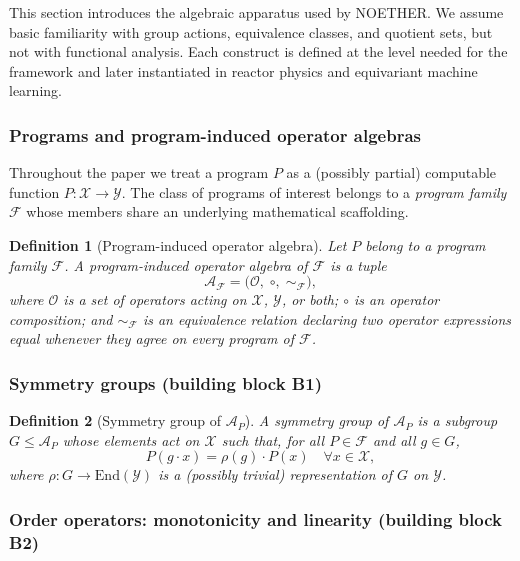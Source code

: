 \documentclass[manuscript]{acmart}
\newtheorem{definition}{Definition}
\begin{document}
This section introduces the algebraic apparatus used by NOETHER. We assume basic familiarity with group actions, equivalence classes, and quotient sets, but not with functional analysis. Each construct is defined at the level needed for the framework and later instantiated in reactor physics and equivariant machine learning.

\subsubsection{Programs and program-induced operator algebras}

Throughout the paper we treat a program $P$ as a (possibly partial) computable function $P: \mathcal{X} \to \mathcal{Y}$. The class of programs of interest belongs to a \emph{program family} $\mathcal{F}$ whose members share an underlying mathematical scaffolding.

\begin{definition}[Program-induced operator algebra]
Let $P$ belong to a program family $\mathcal{F}$. A \emph{program-induced operator algebra} of $\mathcal{F}$ is a tuple
$$\mathcal{A}_{\mathcal{F}} = \bigl(\mathcal{O}, \;\circ, \;\sim_{\mathcal{F}}\bigr),$$
where $\mathcal{O}$ is a set of operators acting on $\mathcal{X}$, $\mathcal{Y}$, or both; $\circ$ is an operator composition; and $\sim_{\mathcal{F}}$ is an equivalence relation declaring two operator expressions equal whenever they agree on every program of $\mathcal{F}$.
\end{definition}

\subsubsection{Symmetry groups (building block B1)}

\begin{definition}[Symmetry group of $\mathcal{A}_P$]
A \emph{symmetry group} of $\mathcal{A}_P$ is a subgroup $G \le \mathcal{A}_P$ whose elements act on $\mathcal{X}$ such that, for all $P \in \mathcal{F}$ and all $g \in G$,
$$P(g \cdot x) = \rho(g) \cdot P(x) \quad \forall x \in \mathcal{X},$$
where $\rho: G \to \mathrm{End}(\mathcal{Y})$ is a (possibly trivial) representation of $G$ on $\mathcal{Y}$.
\end{definition}

\subsubsection{Order operators: monotonicity and linearity (building block B2)}
\end{document}
